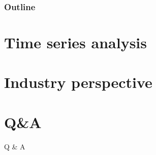 \documentclass[aspectratio=169,xcolor=x11names,table]{beamer}
\begin{document}
\begin{frame}
	\frametitle{Outline}
	\tableofcontents[hideallsubsections]
\end{frame}

\section{Time series analysis}


\section{Industry perspective}

\section{Q\&A}
\begin{frame}{}
	\center
	\Huge Q \& A
\end{frame}
\end{document}
